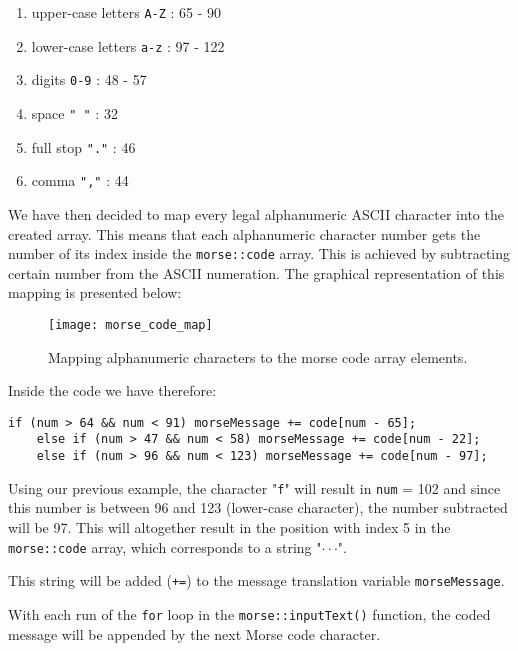 \documentclass[12pt]{report}
\begin{document}
\begin{enumerate}

\item upper-case letters \verb|A-Z| : 65 - 90

\item lower-case letters \verb|a-z| : 97 - 122

\item digits \verb|0-9| : 48 - 57

\item space \verb|" "| : 32

\item full stop \verb|"."| : 46

\item comma \verb|","| : 44

\end{enumerate}


We have then decided to map every legal alphanumeric ASCII character into the created array. This means that each alphanumeric character number gets the number of its index inside the \verb|morse::code| array. This is achieved by subtracting certain number from the ASCII numeration. The graphical representation of this mapping is presented below:

\begin{figure}[H]
\centering\texttt{[image: morse\_code\_map]}
\caption{Mapping alphanumeric characters to the morse code array elements.}				
\label{fig:morse_code_map}
\end{figure}

Inside the code we have therefore:

\begin{lstlisting}
if (num > 64 && num < 91) morseMessage += code[num - 65];
	else if (num > 47 && num < 58) morseMessage += code[num - 22];
	else if (num > 96 && num < 123) morseMessage += code[num - 97];
\end{lstlisting}

Using our previous example, the character "\verb|f|" will result in \verb|num| = 102 and since this number is between 96 and 123 (lower-case character), the number subtracted will be 97. This will altogether result in the position with index 5 in the \verb|morse::code| array, which corresponds to a string "$\cdot\cdot$\text{-}$\cdot$". 

This string will be added (\verb|+=|) to the message translation variable \verb|morseMessage|.

With each run of the \verb|for| loop in the \verb|morse::inputText()| function, the coded message will be appended by the next Morse code character.
\end{document}
